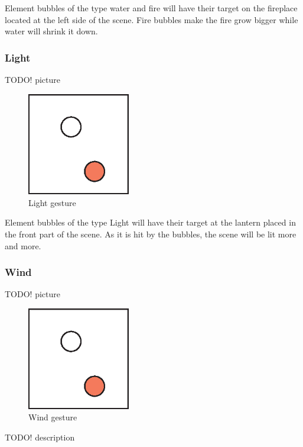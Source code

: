 Element bubbles of the type water and fire will have their target on the fireplace located at the left side of the scene. Fire bubbles make the fire grow bigger while water will shrink it down.

\subsubsection{Light}
TODO! picture\\
\begin{figure}[!ht]
\includegraphics[width=0.4\textwidth]{pictures/sample.eps}
\caption{Light gesture}
\end{figure}

Element bubbles of the type Light will have their target at the lantern placed in the front part of the scene. As it is hit by the bubbles, the scene will be lit more and more.

\subsubsection{Wind}
TODO! picture\\
\begin{figure}[!ht]
\includegraphics[width=0.4\textwidth]{pictures/sample.eps}
\caption{Wind gesture}
\end{figure}
TODO! description\\